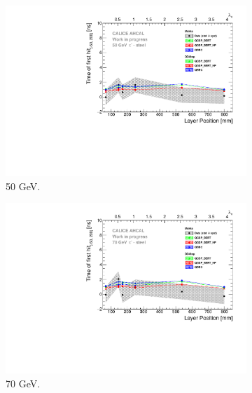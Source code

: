 \begin{figure}[htbp!]
\begin{subfigure}[t]{0.5\textwidth}
		\includegraphics[width=1\textwidth]{../Thesis_Plots/Timing/Pions/Plots/ComparisonToSim/Time_Depth_50GeV.pdf}
		\caption{50 GeV.} \label{fig:Depth_SimData_50GeV}
	\end{subfigure}
	\hfill
	\begin{subfigure}[t]{0.5\textwidth}
		\centering
		\includegraphics[width=1\textwidth]{../Thesis_Plots/Timing/Pions/Plots/ComparisonToSim/Time_Depth_70GeV.pdf}
		\caption{70 GeV.} \label{fig:Depth_SimData_70GeV}
	\end{subfigure}
	\hfill
	\begin{subfigure}[t]{0.5\textwidth}
		\centering

\end{subfigure}
\end{figure}
